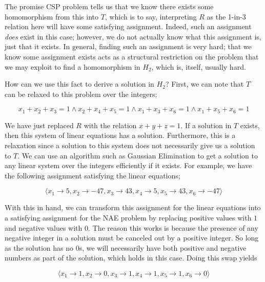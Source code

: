 The promise CSP problem tells us that we know there exists some homomorphism from this into $T$, which is to say, interpreting $R$ as the 1-in-3 relation here will have some satisfying assignment. Indeed, such an assignment \textit{does} exist in this case; however, we do not actually know what this assignment is, just that it exists. In general, finding such an assignment is very hard; that we know some assignment exists acts as a structural restriction on the problem that we may exploit to find a homomorphism in $H_2$, which is, itself, usually hard.

How can we use this fact to derive a solution in $H_2$? First, we can note that $T$ can be relaxed to this problem over the integers;

\begin{equation}
    x_1 + x_2 + x_3 = 1 \wedge x_2 + x_4 + x_5 = 1 \wedge x_1 + x_3 + x_6 = 1 \wedge x_1 + x_5 + x_6 = 1
\end{equation}

We have just replaced $R$ with the relation $x + y + z = 1$. If a solution in $T$ exists, then this system of linear equations has a solution. Furthermore, this is a relaxation since a solution to this system does not necessarily give us a solution to $T$. We can use an algorithm such as Gaussian Elimination to get a solution to any linear system over the integers efficiently if it exists. For example, we have the following assignment satisfying the linear equations;

\begin{equation}
    \langle x_1 \rightarrow 5, x_2 \rightarrow -47, x_3 \rightarrow 43, x_4 \rightarrow 5, x_5 \rightarrow 43, x_6 \rightarrow -47 \rangle
\end{equation}

With this in hand, we can transform this assignment for the linear equations into a satisfying assignment for the NAE problem by replacing positive values with $1$ and negative values with $0$. The reason this works is because the presence of any negative integer in a solution must be canceled out by a positive integer. So long as the solution has no 0s, we will necessarily have both positive and negative numbers as part of the solution, which holds in this case. Doing this swap yields

\begin{equation}
    \langle x_1 \rightarrow 1, x_2 \rightarrow 0, x_3 \rightarrow 1, x_4 \rightarrow 1, x_5 \rightarrow 1, x_6 \rightarrow 0 \rangle
\end{equation}


